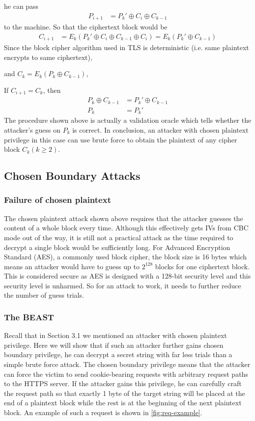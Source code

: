 \documentclass{acm_proc_article-sp}
\begin{document}
he can pass
$$
\begin{aligned}
P_{i+1}&=P_k'\oplus C_i\oplus C_{k-1}
\end{aligned}
$$
to the machine. So that the ciphertext block would be
$$
\begin{aligned}
C_{i+1}&=E_k(P_k'\oplus C_i\oplus C_{k-1}\oplus C_i)=E_k(P_k'\oplus C_{k-1})
\end{aligned}
$$
Since the block cipher algorithm used in TLS is deterministic
(i.e. same plaintext encrypts to same ciphertext),

and $C_k = E_k(P_k\oplus C_{k-1})$,

If $C_{i+1} = C_k$, then
$$
\begin{aligned}
P_k\oplus C_{k-1}&= P_k'\oplus C_{k-1}\\
P_k&= P_k'
\end{aligned}
$$
The procedure shown above is actually a validation oracle which tells whether the attacker's guess
on $P_k$ is correct. In conclusion, an attacker with chosen plaintext privilege in this case can use
brute force to obtain the plaintext of any cipher block $C_k(k\geq 2)$.
\subsection{Chosen Boundary Attacks}
\subsubsection{Failure of chosen plaintext}
The chosen plaintext attack shown above requires that the attacker guesses the content of a whole
block every time. Although this effectively gets IVs from CBC mode out of the way, it is still not a
practical attack as the time required to decrypt a single block would be sufficiently long.
For Advanced Encryption Standard (AES), a commonly used block cipher,
the block size is 16 bytes\cite{aes} which means an attacker would have to guess up to $2^{128}$
blocks for one ciphertext block.
This is considered secure as AES is designed with a 128-bit security level\cite{seclv} and this
security level is unharmed. So for an attack to work, it needs to further reduce the number of guess
trials.
\subsubsection{The BEAST}
Recall that in Section 3.1 we mentioned an attacker with chosen plaintext privilege. Here we
will show that if such an attacker further gains chosen boundary privilege, he can decrypt a secret
string with far less trials than a simple brute force attack. The chosen boundary privilege means that
the attacker can force the victim to send cookie-bearing requests with arbitrary request paths to the
HTTPS server. If the attacker gains this privilege, he can carefully craft the request path so that
exactly 1 byte of the target string will be placed at the end of a plaintext block while the rest is at the
beginning of the next plaintext block. An example of such a request is shown in \ref{fig:req-example}.
\end{document}
